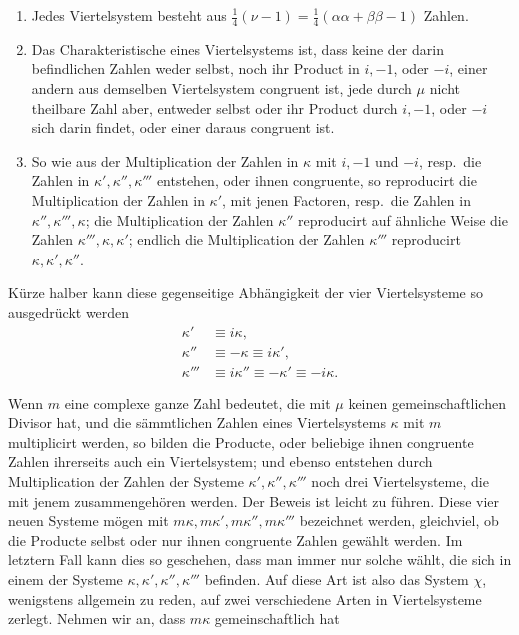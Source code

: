 %
\begin{enumerate}
\renewcommand{\labelenumi}{\arabic{enumi})}
\item Jedes Viertelsystem besteht aus $\frac14(\nu-1)=\frac14(\alpha\alpha+\beta\beta-1)$ Zahlen.
\item Das Charakteristische eines Viertelsystems ist, dass keine der darin befindlichen Zahlen weder selbst, noch ihr Product in $i,-1$, oder $-i$, einer andern aus demselben Viertelsystem congruent ist, jede durch $\mu$ nicht theilbare Zahl aber, entweder selbst oder ihr Product durch $i,-1$, oder $-i$ sich darin findet, oder einer daraus congruent ist.
\item So wie aus der Multiplication der Zahlen in $\kappa$ mit $i,-1$ und $-i$, resp.\ die Zahlen in $\kappa',\kappa'',\kappa'''$ entstehen, oder ihnen congruente, so reproducirt die Multiplication der Zahlen in $\kappa'$, mit jenen Factoren, resp.\ die Zahlen in $\kappa'',\kappa''',\kappa$; die Multiplication der Zahlen $\kappa''$ reproducirt auf ähnliche Weise die Zahlen $\kappa''',\kappa,\kappa'$; endlich die Multiplication der Zahlen $\kappa'''$ reproducirt $\kappa,\kappa',\kappa''$.
\end{enumerate}

Kürze halber kann diese gegenseitige Abhängigkeit der vier Viertelsysteme so ausgedrückt werden
\[
\begin{aligned}
\kappa'&\equiv i\kappa,\\
\kappa''&\equiv-\kappa\equiv i\kappa',\\
\kappa'''&\equiv i\kappa''\equiv-\kappa'\equiv-i\kappa.
\end{aligned}
\]

Wenn $m$ eine complexe ganze Zahl bedeutet, die mit $\mu$ keinen gemeinschaftlichen Divisor hat, und die sämmtlichen Zahlen eines Viertelsystems $\kappa$ mit $m$ multiplicirt werden, so bilden die Producte, oder beliebige ihnen congruente Zahlen ihrerseits auch ein Viertelsystem; und ebenso entstehen durch Multiplication der Zahlen der Systeme $\kappa',\kappa'',\kappa'''$ noch drei Viertelsysteme, die mit jenem zusammengehören werden. Der Beweis ist leicht zu führen. Diese vier neuen Systeme mögen mit $m\kappa,m\kappa',m\kappa'',m\kappa'''$ bezeichnet werden, gleichviel, ob die Producte selbst oder nur ihnen congruente Zahlen gewählt werden. Im letztern Fall kann dies so geschehen, dass man immer nur solche wählt, die sich in einem der Systeme $\kappa,\kappa',\kappa'',\kappa'''$ befinden. Auf diese Art ist also das System $\chi$, wenigstens allgemein zu reden, auf zwei verschiedene Arten in Viertelsysteme zerlegt. Nehmen wir an, dass $m\kappa$ gemeinschaftlich hat

